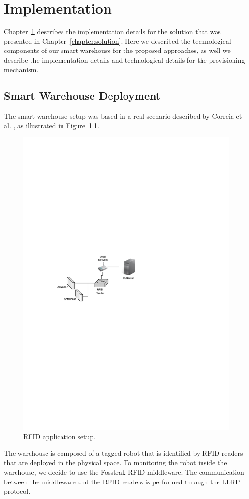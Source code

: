 
\chapter{Implementation}
\label{chapter:implementation}
Chapter~\ref{chapter:implementation} describes the implementation details for the solution that was
presented in Chapter~\ref{chapter:solution}. Here we described the technological components of our
smart warehouse for the proposed approaches, as well we describe the implementation details and
technological details for the provisioning mechanism.

\section{Smart Warehouse Deployment}
\label{sec:Smart Place}
The smart warehouse setup was based in a real scenario described by Correia et al. \cite{correiaalpharfid},
as illustrated in Figure~\ref{fig:rfidapp_setup}.\\

\begin{figure}[ht!]
  \centering
  \includegraphics[width=.6\textwidth]{./images/rfidapp_setup}
  \caption{RFID application setup.}
  \label{fig:rfidapp_setup}
\end{figure}

The warehouse is composed of a tagged robot that is identified by \gls{RFID} readers that are deployed
in the physical space. To monitoring the robot inside the warehouse, we decide to use the Fosstrak
\gls{RFID} middleware. The communication between the middleware and the \gls{RFID} readers is performed
through the \gls{LLRP} protocol.

